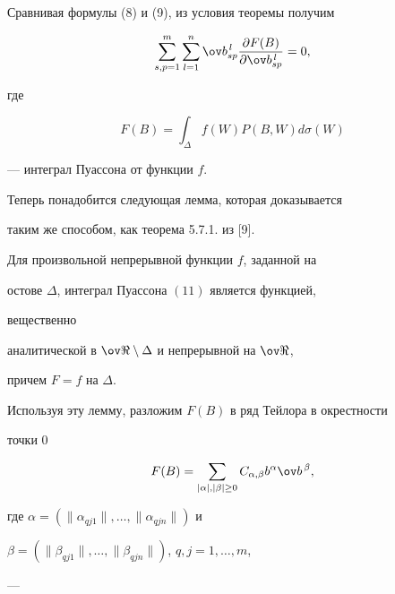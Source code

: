 Сравнивая формулы (8) и (9), из условия теоремы получим 


\begin{equation} 


\sum^m_{s,p=1}\sum^n_{l=1}\ov b^{\,l}_{s p} 


\frac{\partial F(B)}{\partial\ov b^{\,l}_{s p}}=0, 


\end{equation} 


где 


\begin{equation} 


F(B)=\int_\Delta f(W)P(B,W)d\sigma(W) 


\end{equation} 


--- интеграл Пуассона от функции $f$. 


 


Теперь понадобится следующая лемма, которая доказывается 


таким же способом, как теорема 5.7.1. из [9]. 


 


\begin{lem} 


Для произвольной непрерывной функции $f$, заданной на 


остове $\Delta$, интеграл Пуассона $(11)$ является функцией, 


вещественно 


аналитической в $\ov\Re\setminus\Delta$ и непрерывной на $\ov\Re$, 


причем $F=f$ на $\Delta$. 


\end{lem} 


 


Используя эту лемму, разложим $F(B)$ в ряд Тейлора в окрестности 


точки 0 


$$ 


F(B)=\sum_{|\alpha|,|\beta|\ge0}C_{\alpha,\beta} 


b^\alpha\ov b^{\,\beta}, 


$$ 


где $\alpha=(\|\alpha_{q j1}\|,\dotsc,\|\alpha_{q j n}\|)$ и 


$\beta=(\|\beta_{q j1}\|,\dotsc,\|\beta_{q j n}\|)$, $q,j=1,\dotsc,m$,


--- 


